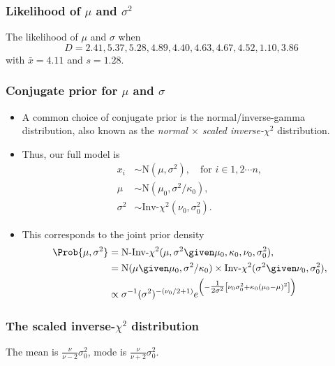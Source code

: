 \documentclass{slides}
\begin{document}
\begin{frame}
	\frametitle{Likelihood of $\mu$ and $\sigma^2$}

	\hspace*{-5mm}
	

	The likelihood of $\mu$ and $\sigma$ when \[
	D = 2.41, 5.37, 5.28, 4.89, 4.40, 4.63, 4.67, 4.52, 1.10, 3.86
	\]
	with $\bar{x}=4.11$ and $s=1.28$.
\end{frame}

\begin{frame}
	\frametitle{Conjugate prior for $\mu$ and $\sigma$}
	\begin{itemize}
		\item A common choice of conjugate prior is the normal/inverse-gamma distribution, also known as the \emph{normal $\times$ scaled inverse-$\chi^2$} distribution.
		\item Thus, our full model is 
			\begin{align*}
				x_i &\sim \textrm{N}(\mu, \sigma^2), \quad\text{for $i\in 1, 2 \cdots n$},\\
				\mu &\sim \textrm{N}(\mu_0, \sigma^2/\kappa_0),\\
				\sigma^2 &\sim \textrm{Inv-}\chi^2(\nu_0, \sigma^2_0).
			\end{align*}
		\item This corresponds to the joint prior density 
			\begin{align*}
				\Prob{\mu,\sigma^2} &= \textrm{N-Inv-}\chi^2(\mu, \sigma^2 \given \mu_0, \kappa_0, \nu_0, \sigma^2_0),\\
				&=\textrm{N}(\mu \given \mu_0, \sigma^2/\kappa_0) \times \textrm{Inv-}\chi^2(\sigma^2\given\nu_0, \sigma^2_0),\\
				&\propto\sigma^{-1}(\sigma^2)^{-(\nu_0/2+1)} e^{\left(-\tfrac{1}{2\sigma^2}\left[ \nu_0\sigma^2_0 + \kappa_0(\mu_0  - \mu)^2 \right]\right)}
			\end{align*}
	\end{itemize}
\end{frame}

\begin{frame}
	\frametitle{The scaled inverse-$\chi^2$ distribution}

	\hspace*{-5mm}
	

	The mean is $\tfrac{\nu}{\nu-2}\sigma^2_0$, mode is $\tfrac{\nu}{\nu+2}\sigma^2_0$.

\end{frame}
\end{document}
